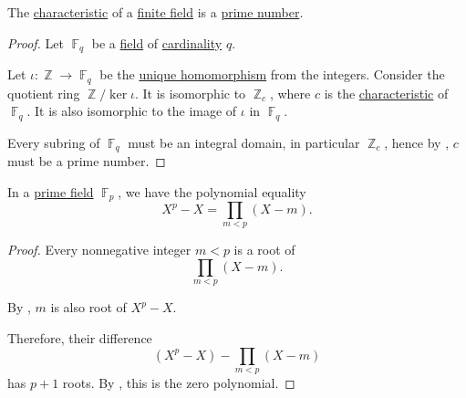 \begin{proposition}\label{thm:finite_field_characteristic}
  The \hyperref[def:semiring_characteristic]{characteristic} of a \hyperref[def:set_finiteness]{finite field} is a \hyperref[def:prime_number]{prime number}.
\end{proposition}
\begin{proof}
  Let \( \BbbF_q \) be a \hyperref[def:field]{field} of \hyperref[def:set_finiteness]{cardinality} \( q \).

  Let \( \iota: \BbbZ \to \BbbF_q \) be the \hyperref[thm:ring_characteristic_homomorphism]{unique homomorphism} from the integers. Consider the quotient ring \( \BbbZ / \ker \iota \). It is isomorphic to \( \BbbZ_c \), where \( c \) is the \hyperref[def:semiring_characteristic]{characteristic} of \( \BbbF_q \). It is also isomorphic to the image of \( \iota \) in \( \BbbF_q \).

  Every subring of \( \BbbF_q \) must be an integral domain, in particular \( \BbbZ_c \), hence by , \( c \) must be a prime number.
\end{proof}

\begin{lemma}\label{thm:prime_field_all_root_polynomial}
  In a \hyperref[thm:prime_fields]{prime field} \( \BbbF_p \), we have the polynomial equality
  \begin{equation*}
    X^p - X = \prod_{m < p} (X - m).
  \end{equation*}
\end{lemma}
\begin{proof}
  Every nonnegative integer \( m < p \) is a root of
  \begin{equation*}
    \prod_{m < p} (X - m).
  \end{equation*}

  By , \( m \) is also root of \( X^p - X \).

  Therefore, their difference
  \begin{equation*}
    (X^p - X) - \prod_{m < p} (X - m)
  \end{equation*}
  has \( p + 1 \) roots. By , this is the zero polynomial.
\end{proof}

